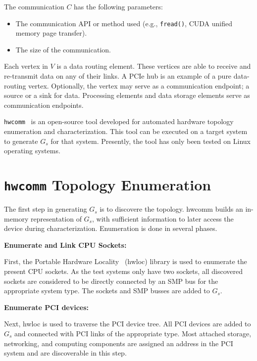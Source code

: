 The communication $C$ has the following parameters:
\begin{itemize}
    \item The communication API or method used (e.g., \texttt{fread()}, CUDA unified memory page transfer).
    \item The size of the communication.
\end{itemize}


Each vertex in $V$ is a data routing element.
These vertices are able to receive and re-transmit data on any of their links.
A PCIe hub  is an example of a pure data-routing vertex.
Optionally, the vertex may serve as a communication endpoint; a source or a sink for data.
Processing elements and data storage elements serve as communication endpoints.


\texttt{hwcomm}~\cite{pearson2018hwcomm} is an open-source tool developed for automated hardware topology enumeration and characterization.
This tool can be executed on a target system to generate $G_s$ for that system.
Presently, the tool has only been tested on Linux operating systems.



%
%
\section{\texttt{hwcomm} Topology Enumeration}
\label{sec:topology-exploration}

The first step in generating $G_s$ is to discovere the topology.
hwcomm builds an in-memory representation of $G_s$, with sufficient information to later access the device during characterization.
Enumeration is done in several phases.

\textbf{Enumerate and Link CPU Sockets:}

First, the Portable Hardware Locality~\cite{broquedis2010hwloc} (hwloc) library is used to enumerate the present CPU sockets.
As the test systems only have two sockets, all discovered sockets are considered to be directly connected by an SMP bus for the appropriate system type.
The sockets and SMP busses are added to $G_s$.

\textbf{Enumerate PCI devices:}

Next, hwloc is used to traverse the PCI device tree.
All PCI devices are added to $G_s$ and connected with PCI links of the appropriate type.
Most attached storage, networking, and computing components are assigned an address in the PCI system and are discoverable in this step.

